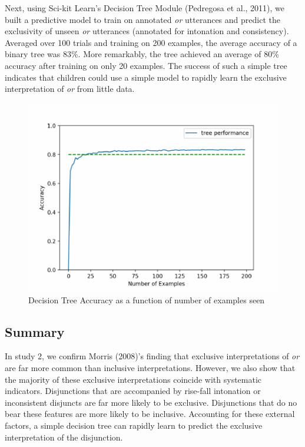 \documentclass[10pt, letterpaper]{article}
\newenvironment{CodeChunk}{}{}
\begin{document}
Next, using Sci-kit Learn's Decision Tree Module (Pedregosa et al.,
2011), we built a predictive model to train on annotated \emph{or}
utterances and predict the exclusivity of unseen \emph{or} utterances
(annotated for intonation and consistency). Averaged over 100 trials and
training on 200 examples, the average accuracy of a binary tree was
83\%. More remarkably, the tree achieved an average of 80\% accuracy
after training on only 20 examples. The success of such a simple tree
indicates that children could use a simple model to rapidly learn the
exclusive interpretation of \emph{or} from little data.

\begin{CodeChunk}
\begin{figure}[H]

{\centering \includegraphics{figs/learningCurve-1} 

}

\caption[Decision Tree Accuracy as a function of number of examples seen]{Decision Tree Accuracy as a function of number of examples seen}\label{fig:learningCurve}
\end{figure}
\end{CodeChunk}

\subsection{Summary}\label{summary}

In study 2, we confirm Morris (2008)'s finding that exclusive
interpretations of \emph{or} are far more common than inclusive
interpretations. However, we also show that the majority of these
exclusive interpretations coincide with systematic indicators.
Disjunctions that are accompanied by rise-fall intonation or
inconsistent disjuncts are far more likely to be exclusive. Disjunctions
that do no bear these features are more likely to be inclusive.
Accounting for these external factors, a simple decision tree can
rapidly learn to predict the exclusive interpretation of the
disjunction.
\end{document}
